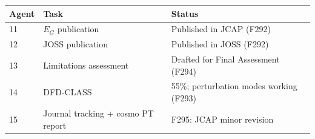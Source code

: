 \documentclass[11pt,a4paper]{article}
\begin{document}
\begin{tcolorbox}[colback=green!5!white, colframe=dfdgreen]
\begin{center}
\begin{tabular}{lll}
\toprule
\textbf{Agent} & \textbf{Task} & \textbf{Status} \\
\midrule
11 & $E_G$ publication & Published in JCAP (F292) \\
12 & JOSS publication & Published in JOSS (F292) \\
13 & Limitations assessment & Drafted for Final Assessment (F294) \\
14 & DFD-CLASS & 55\%; perturbation modes working (F293) \\
15 & Journal tracking + cosmo PT report & F295: JCAP minor revision \\
\bottomrule
\end{tabular}
\end{center}
\end{tcolorbox}
\end{document}
